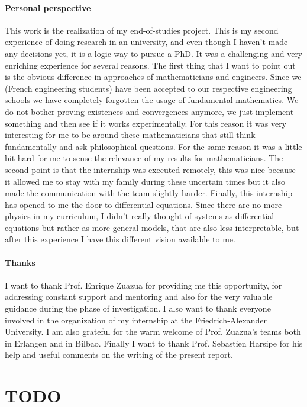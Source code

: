 \documentclass[12pt, letterpaper]{article}
\begin{document}
\paragraph{Personal perspective} This work is the realization of my end-of-studies project. 
This is my second experience of doing research in an university, and even though I haven’t made any decisions yet, it is a logic way to pursue a PhD. 
It was a challenging and very enriching experience for several reasons. 
The first thing that I want to point out is the obvious difference in approaches of mathematicians and engineers. Since we (French engineering students) have been accepted to our respective engineering schools we have completely forgotten the usage of fundamental mathematics. 
We do not bother proving existences and convergences anymore, we just implement something and then see if it works experimentally. 
For this reason it was very interesting for me to be around these mathematicians that still think fundamentally and ask philosophical questions. 
For the same reason it was a little bit hard for me to sense the relevance of my results for mathematicians.
The second point is that the internship was executed remotely, this was nice because it allowed me to stay with my family during these uncertain times but it also made the communication with the team slightly harder.
Finally, this internship has opened to me the door to differential equations. 
Since there are no more physics in my curriculum, I didn't really thought of systems as differential equations but rather as more general models, that are also less interpretable, but after this experience I have this different vision available to me.


\paragraph{Thanks} I want to thank Prof. Enrique Zuazua for providing me this opportunity, for addressing constant support and mentoring and also for the very valuable guidance during the phase of investigation. 
I also want to thank everyone involved in the organization of my internship at the Friedrich-Alexander University. 
I am also grateful for the warm welcome of Prof. Zuazua's teams both in Erlangen and in Bilbao. 
Finally I want to thank Prof. Sebastien Harsipe for his help and useful comments on the writing of the present report.

\section*{TODO}
\end{document}

